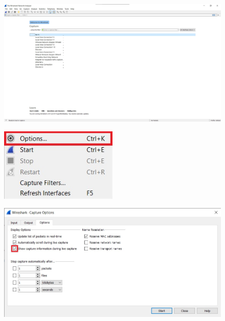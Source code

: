 \documentclass{article}
\begin{document}


\newpage



\section{}
\subsection{}
\begin{figure}[H]
    \centering
    \includegraphics[width=1.0\textwidth]{figures/1.jpg}
    \caption{}
    \label{fig:fig1}
\end{figure}

\begin{figure}[H]
    \centering
    \includegraphics[width=0.5\textwidth]{figures/2.jpg}
    \caption{}
    \label{fig:fig1}
\end{figure}

\begin{figure}[H]
    \centering
    \includegraphics[width=1.0\textwidth]{figures/3.jpg}
    \caption{}
    \label{fig:fig1}
\end{figure}
\end{document}
